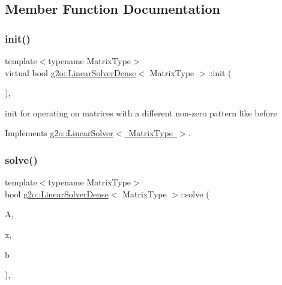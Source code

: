\subsection{Member Function Documentation}
\mbox{\label{classg2o_1_1_linear_solver_dense_a24f68ecd4b022269dbfc4d990eb5c57b}} 
\subsubsection{\texorpdfstring{init()}{init()}}
{\footnotesize\ttfamily template$<$typename Matrix\+Type$>$ \\
virtual bool \mbox{\hyperlink{classg2o_1_1_linear_solver_dense}{g2o\+::\+Linear\+Solver\+Dense}}$<$ Matrix\+Type $>$\+::init (\begin{DoxyParamCaption}{ }\end{DoxyParamCaption})\hspace{0.3cm}{\ttfamily [inline]}, {\ttfamily [virtual]}}

init for operating on matrices with a different non-\/zero pattern like before 

Implements \mbox{\hyperlink{classg2o_1_1_linear_solver_aebd961a94ef6de1bc66d2ca41dd2b17b}{g2o\+::\+Linear\+Solver$<$ Matrix\+Type $>$}}.

\mbox{\label{classg2o_1_1_linear_solver_dense_a8b6eafa6e53b9f705a4e8eb436eeb403}} 
\subsubsection{\texorpdfstring{solve()}{solve()}}
{\footnotesize\ttfamily template$<$typename Matrix\+Type$>$ \\
bool \mbox{\hyperlink{classg2o_1_1_linear_solver_dense}{g2o\+::\+Linear\+Solver\+Dense}}$<$ Matrix\+Type $>$\+::solve (\begin{DoxyParamCaption}\item[{const \mbox{\hyperlink{classg2o_1_1_sparse_block_matrix}{Sparse\+Block\+Matrix}}$<$ Matrix\+Type $>$ \&}]{A,  }\item[{double $\ast$}]{x,  }\item[{double $\ast$}]{b }\end{DoxyParamCaption})\hspace{0.3cm}{\ttfamily [inline]}, {\ttfamily [virtual]}}


